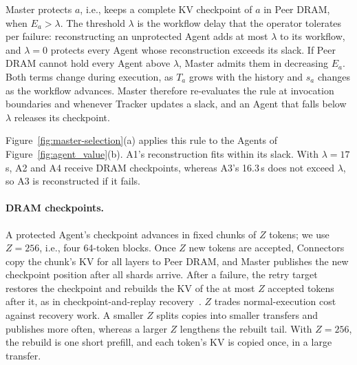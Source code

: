 Master protects $a$, i.e., keeps a complete KV checkpoint of $a$ in Peer
DRAM, when $E_a>\lambda$. The threshold $\lambda$ is the workflow delay
that the operator tolerates per failure: reconstructing an unprotected
Agent adds at most $\lambda$ to its workflow, and $\lambda=0$ protects
every Agent whose reconstruction exceeds its slack. If Peer DRAM cannot
hold every Agent above $\lambda$, Master admits them in decreasing $E_a$.
Both terms change during execution, as $T_a$ grows with the history and
$s_a$ changes as the workflow advances. Master therefore re-evaluates the
rule at invocation boundaries and whenever Tracker updates a slack, and an
Agent that falls below $\lambda$ releases its checkpoint.

Figure~\ref{fig:master-selection}(a) applies this rule to the Agents of
Figure~\ref{fig:agent_value}(b). A1's reconstruction fits within its
slack. With $\lambda=17$\,s, A2 and A4 receive DRAM checkpoints, whereas
A3's 16.3\,s does not exceed $\lambda$, so A3 is reconstructed if it fails.

\paragraph{DRAM checkpoints.}
\label{sec:master-checkpoint}
A protected Agent's checkpoint advances in fixed chunks of $Z$ tokens; we
use $Z=256$, i.e., four 64-token blocks. Once $Z$ new tokens are
accepted, Connectors copy the chunk's KV for all layers to Peer DRAM, and
Master publishes the new checkpoint position after all shards arrive.
After a failure, the retry target restores the checkpoint and rebuilds
the KV of the at most $Z$ accepted tokens after it, as in
checkpoint-and-replay recovery~\cite{strati2024dejavu,cao2026lumen}. $Z$
trades normal-execution cost against recovery work. A smaller $Z$ splits
copies into smaller transfers and publishes more often, whereas a larger
$Z$ lengthens the rebuilt tail. With $Z=256$, the rebuild is one short
prefill, and each token's KV is copied once, in a large transfer.

